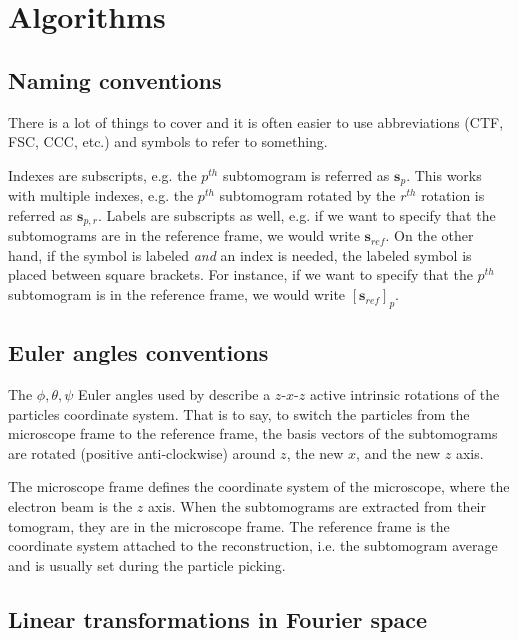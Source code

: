 \section{Algorithms} \label{sec:algo}

\subsection{Naming conventions} \label{sec:algo:naming_conventions}

There is a lot of things to cover and it is often easier to use abbreviations (CTF, FSC, CCC, etc.) and symbols to refer to something.



Indexes are subscripts, e.g. the $p^{th}$ subtomogram is referred as $\bm{s}_p$. This works with multiple indexes, e.g. the $p^{th}$ subtomogram rotated by the $r^{th}$ rotation is referred as $\bm{s}_{p,r}$. Labels are subscripts as well, e.g. if we want to specify that the subtomograms are in the reference frame, we would write $\bm{s}_{ref}$. On the other hand, if the symbol is labeled \emph{and} an index is needed, the labeled symbol is placed between square brackets. For instance, if we want to specify that the $p^{th}$ subtomogram is in the reference frame, we would write ${[\bm{s}_{ref}]}_p$.


\subsection{Euler angles conventions} \label{sec:algo:euler_conventions}

The $\phi, \theta, \psi$ Euler angles used by {\emClarity} describe a $z\text{-}x\text{-}z$ active intrinsic rotations of the particles coordinate system. That is to say, to switch the particles from the microscope frame to the reference frame, the basis vectors of the subtomograms are rotated (positive anti-clockwise) around $z$, the new $x$, and the new $z$ axis.

The microscope frame defines the coordinate system of the microscope, where the electron beam is the $z$ axis. When the subtomograms are extracted from their tomogram, they are in the microscope frame. The reference frame is the coordinate system attached to the reconstruction, i.e. the subtomogram average and is usually set during the particle picking.


\subsection{Linear transformations in Fourier space}

